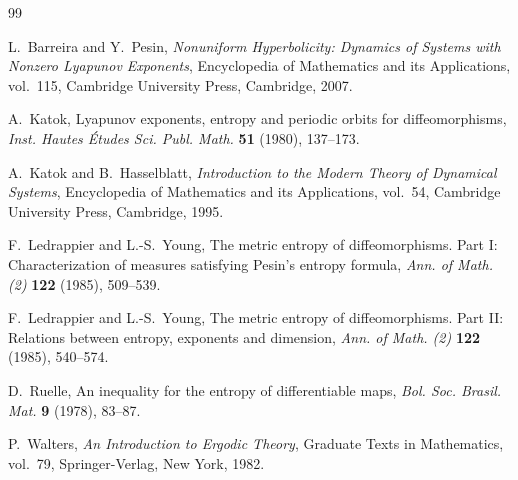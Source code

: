\documentclass[11pt]{article}
\theoremstyle{definition}
\theoremstyle{remark}
\begin{document}
\begin{thebibliography}{99}

L.~Barreira and Y.~Pesin,
\emph{Nonuniform Hyperbolicity: Dynamics of Systems with Nonzero
Lyapunov Exponents},
Encyclopedia of Mathematics and its Applications, vol.~115,
Cambridge University Press, Cambridge, 2007.

A.~Katok,
Lyapunov exponents, entropy and periodic orbits for diffeomorphisms,
\emph{Inst. Hautes \'Etudes Sci. Publ. Math.} \textbf{51} (1980),
137--173.

A.~Katok and B.~Hasselblatt,
\emph{Introduction to the Modern Theory of Dynamical Systems},
Encyclopedia of Mathematics and its Applications, vol.~54,
Cambridge University Press, Cambridge, 1995.

F.~Ledrappier and L.-S.~Young,
The metric entropy of diffeomorphisms. Part I: Characterization of
measures satisfying Pesin's entropy formula,
\emph{Ann. of Math. (2)} \textbf{122} (1985), 509--539.

F.~Ledrappier and L.-S.~Young,
The metric entropy of diffeomorphisms. Part II: Relations between
entropy, exponents and dimension,
\emph{Ann. of Math. (2)} \textbf{122} (1985), 540--574.

D.~Ruelle,
An inequality for the entropy of differentiable maps,
\emph{Bol. Soc. Brasil. Mat.} \textbf{9} (1978), 83--87.

P.~Walters,
\emph{An Introduction to Ergodic Theory},
Graduate Texts in Mathematics, vol.~79,
Springer-Verlag, New York, 1982.

\end{thebibliography}
\end{document}
